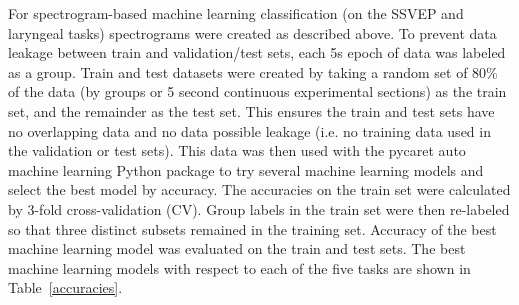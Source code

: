 \documentclass{article}
\begin{document}
For spectrogram-based machine learning classification  (on the SSVEP and laryngeal tasks) spectrograms were created as described above. To prevent data leakage between train and validation/test sets, each 5s epoch of data was labeled as a group. Train and test datasets were created by taking a random set of 80\% of the data (by groups or 5 second continuous experimental sections) as the train set, and the remainder as the test set. This ensures the train and test sets have no overlapping data and no data possible leakage (i.e. no training data used in the validation or test sets). This data was then used with the pycaret auto machine learning Python package to try several machine learning models and select the best model by accuracy. The accuracies on the train set were calculated by 3-fold cross-validation (CV). Group labels in the train set were then re-labeled so that three distinct subsets remained in the training set. Accuracy of the best machine learning model was evaluated on the train and test sets. The best machine learning models with respect to each of the five tasks are shown in Table~\ref{accuracies}.
\end{document}

